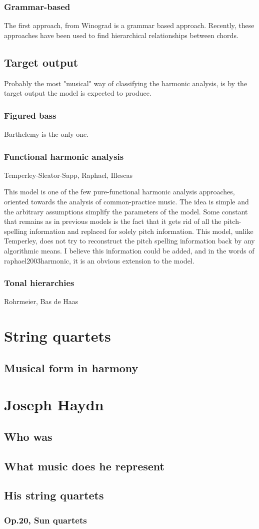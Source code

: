     \subsubsection{Grammar-based}
    The first approach, from Winograd is a grammar based approach. Recently, these approaches have been used to find hierarchical relationships between chords.
  \subsection{Target output}
  Probably the most "musical" way of classifying the harmonic analysis, is by the target output the model is expected to produce.
    \subsubsection{Figured bass}
    Barthelemy is the only one.
    \subsubsection{Functional harmonic analysis}
    Temperley-Sleator-Sapp, Raphael, Illescas

    This model is one of the few pure-functional harmonic analysis approaches, oriented towards the analysis of common-practice music. The idea is simple and the arbitrary assumptions simplify the parameters of the model. Some constant that remains as in previous models is the fact that it gets rid of all the pitch-spelling information and replaced for solely pitch information. This model, unlike Temperley, does not try to reconstruct the pitch spelling information back by any algorithmic means. I believe this information could be added, and in the words of raphael2003harmonic, it is an obvious extension to the model.

    \subsubsection{Tonal hierarchies}
    Rohrmeier, Bas de Haas
\section{String quartets}
  \subsection{Musical form in harmony}
\section{Joseph Haydn}
  \subsection{Who was}
  \subsection{What music does he represent}
  \subsection{His string quartets}
    \subsubsection{Op.20, Sun quartets}

\newpage
